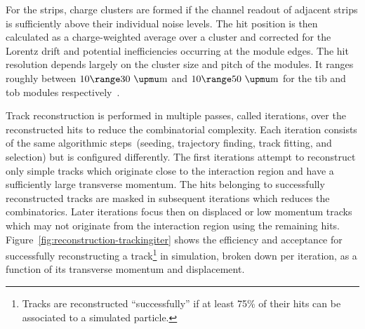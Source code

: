 For the strips, charge clusters are formed if the channel readout of adjacent strips is sufficiently above their individual noise levels. The hit position is then calculated as a charge-weighted average over a cluster and corrected for the Lorentz drift and potential inefficiencies occurring at the module edges. The hit resolution depends largely on the cluster size and pitch of the modules. It ranges roughly between $10\range30~\upmu\mathrm{m}$ and $10\range50~\upmu\mathrm{m}$ for the \gls{tib} and \gls{tob} modules respectively~\cite{Chatrchyan:2014fea}.

Track reconstruction is performed in multiple passes, called iterations, over the reconstructed hits to reduce the combinatorial complexity. Each iteration consists of the same algorithmic steps~(seeding, trajectory finding, track fitting, and selection) but is configured differently. The first iterations attempt to reconstruct only simple tracks which originate close to the interaction region and have a sufficiently large transverse momentum. The hits belonging to successfully reconstructed tracks are masked in subsequent iterations which reduces the combinatorics. Later iterations focus then on displaced or low momentum tracks which may not originate from the interaction region using the remaining hits. Figure~\ref{fig:reconstruction-trackingiter} shows the efficiency and acceptance for successfully reconstructing a track\footnote{Tracks are reconstructed ``successfully'' if at least 75\% of their hits can be associated to a simulated particle.} in simulation, broken down per iteration, as a function of its transverse momentum and displacement.

